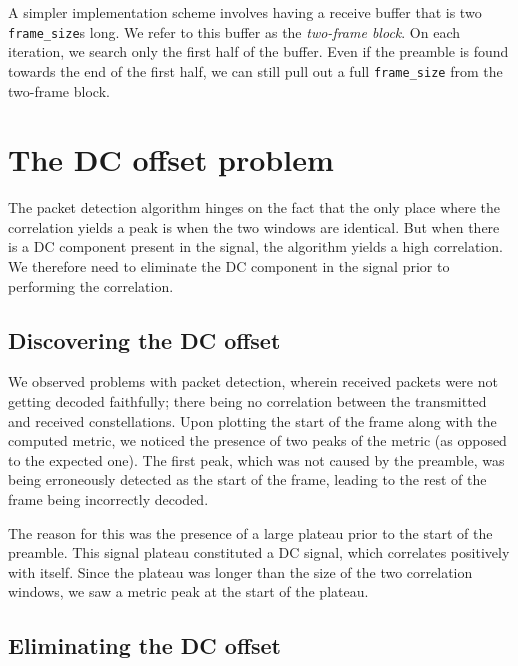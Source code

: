 A simpler implementation scheme involves having a receive buffer that is two
\verb+frame_size+s long. We refer to this buffer as the \emph{two-frame block}.
On each iteration, we search only the first half of the buffer. Even if the
preamble is found towards the end of the first half, we can still pull out a
full \verb+frame_size+ from the two-frame block.


\section{The DC offset problem}

The packet detection algorithm hinges on the fact that the only place where
the correlation yields a peak is when the two windows are identical. But when
there is a DC component present in the signal, the algorithm yields a high
correlation. We therefore need to eliminate the DC component in the signal
prior to performing the correlation.

\subsection{Discovering the DC offset}

We observed problems with packet detection, wherein received packets were not
getting decoded faithfully; there being no correlation between the transmitted
and received constellations. Upon plotting the start of the frame along with
the computed metric, we noticed the presence of two peaks of the metric (as
opposed to the expected one). The first peak, which was not caused by the
preamble, was being erroneously detected as the start of the frame, leading to
the rest of the frame being incorrectly decoded.

The reason for this was the presence of a large plateau prior to the start of
the preamble. This signal plateau constituted a DC signal, which correlates
positively with itself. Since the plateau was longer than the size of the two
correlation windows, we saw a metric peak at the start of the plateau.


\subsection{Eliminating the DC offset}

